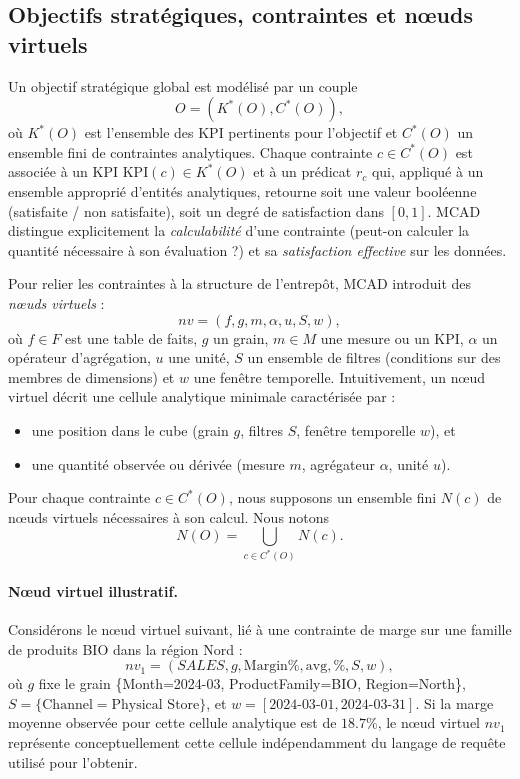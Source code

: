 \documentclass[journal]{IEEEtran}
\begin{document}
\subsection{Objectifs stratégiques, contraintes et nœuds virtuels}

Un objectif stratégique global est modélisé par un couple
\[
O=(K^*(O),C^*(O)),
\]
où $K^*(O)$ est l'ensemble des KPI pertinents pour l'objectif et $C^*(O)$ un ensemble fini de contraintes analytiques. Chaque contrainte $c\in C^*(O)$ est associée à un KPI $\mathrm{KPI}(c)\in K^*(O)$ et à un prédicat $r_c$ qui, appliqué à un ensemble approprié d'entités analytiques, retourne soit une valeur booléenne (satisfaite / non satisfaite), soit un degré de satisfaction dans $[0,1]$. MCAD distingue explicitement la \emph{calculabilité} d'une contrainte (peut-on calculer la quantité nécessaire à son évaluation ?) et sa \emph{satisfaction effective} sur les données.

Pour relier les contraintes à la structure de l'entrepôt, MCAD introduit des \emph{nœuds virtuels} :
\[
nv=(f,g,m,\alpha,u,S,w),
\]
où $f\in F$ est une table de faits, $g$ un grain, $m\in M$ une mesure ou un KPI, $\alpha$ un opérateur d'agrégation, $u$ une unité, $S$ un ensemble de filtres (conditions sur des membres de dimensions) et $w$ une fenêtre temporelle. Intuitivement, un nœud virtuel décrit une cellule analytique minimale caractérisée par :
\begin{itemize}
  \item une position dans le cube (grain $g$, filtres $S$, fenêtre temporelle $w$), et
  \item une quantité observée ou dérivée (mesure $m$, agrégateur $\alpha$, unité $u$).
\end{itemize}

Pour chaque contrainte $c\in C^*(O)$, nous supposons un ensemble fini $N(c)$ de nœuds virtuels nécessaires à son calcul. Nous notons
\[
N(O)=\bigcup_{c\in C^*(O)} N(c).
\]

\paragraph*{Nœud virtuel illustratif.}
Considérons le nœud virtuel suivant, lié à une contrainte de marge sur une famille de produits BIO dans la région Nord :
\[
nv_1=(\textit{SALES},g,\mathrm{Margin\%},\mathrm{avg},\%,S,w),
\]
où $g$ fixe le grain \{Month=2024-03, ProductFamily=BIO, Region=North\}, $S=\{\text{Channel}=\text{Physical Store}\}$, et $w=[2024\text{-}03\text{-}01,2024\text{-}03\text{-}31]$. Si la marge moyenne observée pour cette cellule analytique est de $18.7\%$, le nœud virtuel $nv_1$ représente conceptuellement cette cellule indépendamment du langage de requête utilisé pour l'obtenir.
\end{document}

